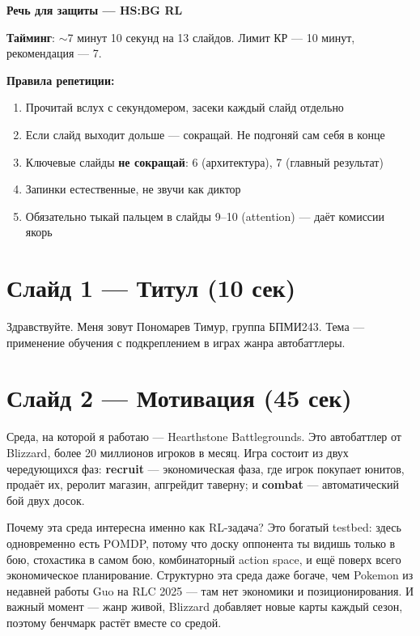 \documentclass[a4paper,12pt]{extarticle}
\begin{document}
\begin{center}
{\Large\bfseries Речь для защиты --- HS:BG RL}
\end{center}

\textbf{Тайминг}: $\sim$7 минут 10 секунд на 13 слайдов. Лимит КР --- 10 минут, рекомендация --- 7.

\textbf{Правила репетиции:}
\begin{enumerate}[noitemsep]
  \item Прочитай вслух с секундомером, засеки каждый слайд отдельно
  \item Если слайд выходит дольше --- сокращай. Не подгоняй сам себя в конце
  \item Ключевые слайды \textbf{не сокращай}: 6 (архитектура), 7 (главный результат)
  \item Запинки естественные, не звучи как диктор
  \item Обязательно тыкай пальцем в слайды 9--10 (attention) --- даёт комиссии якорь
\end{enumerate}

\hrulefill

\section*{Слайд 1 --- Титул (10 сек)}

Здравствуйте. Меня зовут Пономарев Тимур, группа БПМИ243. Тема --- применение обучения с подкреплением в играх жанра автобаттлеры.

\section*{Слайд 2 --- Мотивация (45 сек)}

Среда, на которой я работаю --- Hearthstone Battlegrounds. Это автобаттлер от Blizzard, более 20 миллионов игроков в месяц. Игра состоит из двух чередующихся фаз: \textbf{recruit} --- экономическая фаза, где игрок покупает юнитов, продаёт их, реролит магазин, апгрейдит таверну; и \textbf{combat} --- автоматический бой двух досок.

Почему эта среда интересна именно как RL-задача? Это богатый testbed: здесь одновременно есть POMDP, потому что доску оппонента ты видишь только в бою, стохастика в самом бою, комбинаторный action space, и ещё поверх всего экономическое планирование. Структурно эта среда даже богаче, чем Pokemon из недавней работы Guo на RLC 2025 --- там нет экономики и позиционирования. И важный момент --- жанр живой, Blizzard добавляет новые карты каждый сезон, поэтому бенчмарк растёт вместе со средой.
\end{document}
